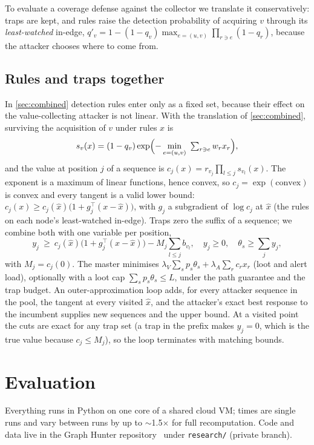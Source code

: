 \documentclass[10pt,twocolumn]{article}
\begin{document}
To evaluate a coverage defense against the collector we translate it conservatively: traps
are kept, and rules raise the detection probability of acquiring $v$ through its
\emph{least-watched} in-edge, $q'_v = 1-(1-q_v)\max_{e=(u,v)}\prod_{r\ni e}(1-q_r)$, because
the attacker chooses where to come from.

\subsection{Rules and traps together}\label{sec:jointrules}

In \cref{sec:combined} detection rules enter only as a fixed set, because their effect on the
value-collecting attacker is not linear. With the translation of \cref{sec:combined}, surviving
the acquisition of $v$ under rules $x$ is
\[
s_v(x) = (1-q_v)\exp\Bigl(-\min_{e=(u,v)}\ \textstyle\sum_{r\ni e} w_r x_r\Bigr),
\]
and the value at position $j$ of a sequence is $c_j(x)=r_{v_j}\prod_{l\le j}s_{v_l}(x)$. The
exponent is a maximum of linear functions, hence convex, so $c_j=\exp(\text{convex})$ is convex
and every tangent is a valid lower bound:
$c_j(x)\ge c_j(\hat x)\bigl(1+g_j^\top(x-\hat x)\bigr)$, with $g_j$ a subgradient of $\log c_j$ at
$\hat x$ (the rules on each node's least-watched in-edge). Traps zero the suffix of a sequence;
we combine both with one variable per position,
\[
y_j\ \ge\ c_j(\hat x)\bigl(1+g_j^\top(x-\hat x)\bigr) - M_j\textstyle\sum_{l\le j} b_{v_l},\quad
y_j\ge0,\quad \theta_s\ge\textstyle\sum_j y_j,
\]
with $M_j=c_j(0)$. The master minimises $\lambda_V\sum_s p_s\theta_s+\lambda_A\sum_r c_r x_r$
(loot and alert load), optionally with a loot cap $\sum_s p_s\theta_s\le L$, under the path
guarantee and the trap budget. An outer-approximation loop adds, for every attacker sequence in
the pool, the tangent at every visited $\hat x$, and the attacker's exact best response to the
incumbent supplies new sequences and the upper bound. At a visited point the cuts are exact for
any trap set (a trap in the prefix makes $y_j=0$, which is the true value because
$c_j\le M_j$), so the loop terminates with matching bounds.

\section{Evaluation}\label{sec:eval}

Everything runs in Python on one core of a shared cloud VM; times are single runs and vary
between runs by up to $\sim$1.5$\times$ for full recomputation. Code and data live in the
Graph Hunter repository~\cite{graphhunter} under \texttt{research/} (private branch).
\end{document}
